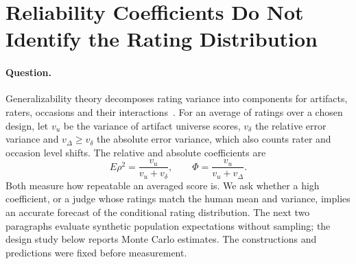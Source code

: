 \section{Reliability Coefficients Do Not Identify the Rating Distribution}\label{app:reliability}

\paragraph{Question.}
Generalizability theory decomposes rating variance into components for artifacts, raters, occasions and their interactions~\citep{shavelson1989generalizability}.
For an average of ratings over a chosen design, let $v_u$ be the variance of artifact universe scores, $v_\delta$ the relative error variance and $v_\Delta\ge v_\delta$ the absolute error variance, which also counts rater and occasion level shifts.
The relative and absolute coefficients are
\begin{equation}
E\rho^2=\frac{v_u}{v_u+v_\delta},\qquad \Phi=\frac{v_u}{v_u+v_\Delta}.
\end{equation}
Both measure how repeatable an averaged score is.
We ask whether a high coefficient, or a judge whose ratings match the human mean and variance, implies an accurate forecast of the conditional rating distribution.
The next two paragraphs evaluate synthetic population expectations without sampling; the design study below reports Monte Carlo estimates.
The constructions and predictions were fixed before measurement.

